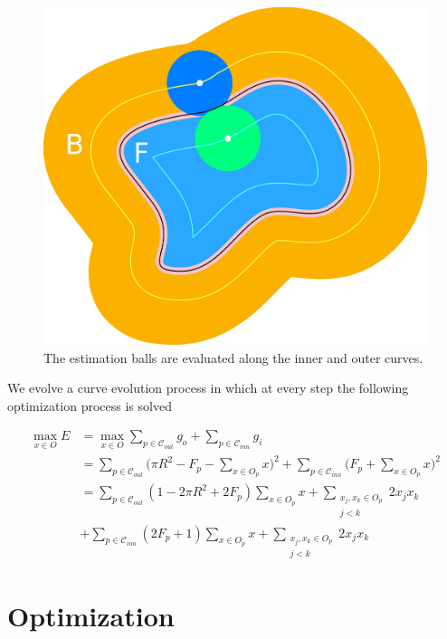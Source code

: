 \begin{figure}[h!]\label{fig:integral}
\center
\includegraphics[scale=0.25]{figures/chapter5/max-energy/integral-2.png}
\caption{The estimation balls are evaluated along the inner and outer curves.}
\end{figure}


We evolve a curve evolution process in which at every step the following optimization process is solved

\begin{align}\label{eq:max-energy}
	\max_{x \in O}{E} &= \max_{x \in O} \sum_{p \in \mathcal{C}_{out}}{g_o} + \sum_{p \in \mathcal{C}_{inn}}{g_i}\\\nonumber 
	&=\sum_{p \in \mathcal{C}_{out}}{ \big( \pi R^2 - F_p - \sum_{x \in O_p}{x}\big)^2} + \sum_{p \in \mathcal{C}_{inn}}{ \big( F_p + \sum_{x \in O_p}{x}\big)^2}\\\nonumber
	&= \sum_{p \in \mathcal{C}_{out}}{ (1 - 2\pi R^2 + 2F_p) \sum_{x \in O_p}{x} + \sum_{ \substack{ x_j,x_k \in O_p \\ j < k}}{2x_jx_k}}\\\nonumber
	&+ \sum_{p \in \mathcal{C}_{inn}}{(2F_p + 1)\sum_{x \in O_p}{x} + \sum_{\substack{ x_j,x_k \in O_p \\ j < k}}{2x_jx_k}}	
\end{align}


\section{Optimization}

